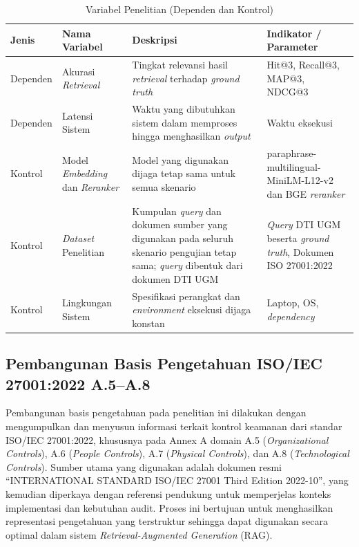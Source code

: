 \begin{table}[H]
\centering
\small
\caption{Variabel Penelitian (Dependen dan Kontrol)}
\label{tab:variabel_penelitian_lanjutan}
\begin{tabular}{|>{\raggedright\arraybackslash}p{1.8cm}|>{\raggedright\arraybackslash}p{3.0cm}|>{\raggedright\arraybackslash}p{4.6cm}|>{\raggedright\arraybackslash}p{3.4cm}|}
\hline
\textbf{Jenis} & \textbf{Nama Variabel} & \textbf{Deskripsi} & \textbf{Indikator / Parameter} \\
\hline
Dependen & Akurasi \textit{Retrieval} & Tingkat relevansi hasil \textit{retrieval} terhadap \textit{ground truth} & Hit@3, Recall@3, MAP@3, NDCG@3 \\
\hline
Dependen & Latensi Sistem & Waktu yang dibutuhkan sistem dalam memproses hingga menghasilkan \textit{output} & Waktu eksekusi \\
\hline
Kontrol & Model \textit{Embedding} dan \textit{Reranker} & Model yang digunakan dijaga tetap sama untuk semua skenario & paraphrase-multilingual-MiniLM-L12-v2 dan BGE \textit{reranker} \\
\hline
Kontrol & \textit{Dataset} Penelitian & Kumpulan \textit{query} dan dokumen sumber yang digunakan pada seluruh skenario pengujian tetap sama; \textit{query} dibentuk dari dokumen DTI UGM & \textit{Query} DTI UGM beserta \textit{ground truth}, Dokumen ISO 27001:2022 \\
\hline
Kontrol & Lingkungan Sistem & Spesifikasi perangkat dan \textit{environment} eksekusi dijaga konstan & Laptop, OS, \textit{dependency} \\
\hline
\end{tabular}
\end{table}

\subsection{Pembangunan Basis Pengetahuan ISO/IEC 27001:2022 A.5--A.8}

Pembangunan basis pengetahuan pada penelitian ini dilakukan dengan mengumpulkan dan menyusun informasi terkait kontrol keamanan dari standar ISO/IEC 27001:2022, khususnya pada Annex A domain A.5 (\textit{Organizational Controls}), A.6 (\textit{People Controls}), A.7 (\textit{Physical Controls}), dan A.8 (\textit{Technological Controls}). Sumber utama yang digunakan adalah dokumen resmi ``INTERNATIONAL STANDARD ISO/IEC 27001 Third Edition 2022-10'', yang kemudian diperkaya dengan referensi pendukung untuk memperjelas konteks implementasi dan kebutuhan audit. Proses ini bertujuan untuk menghasilkan representasi pengetahuan yang terstruktur sehingga dapat digunakan secara optimal dalam sistem \textit{Retrieval-Augmented Generation} (RAG).

